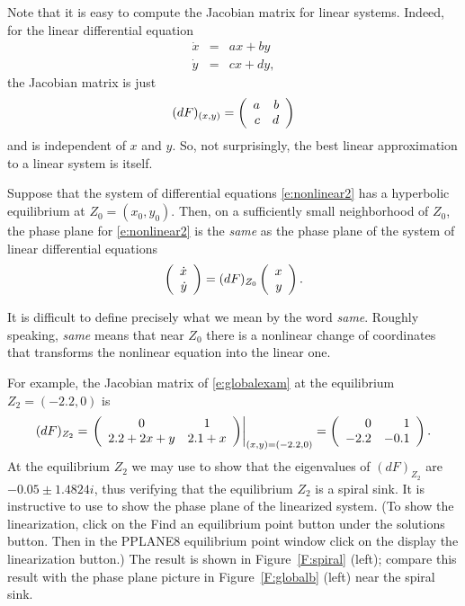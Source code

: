 \documentclass{ximera}
\begin{document}
Note that it is easy to compute the Jacobian matrix for linear 
systems.  Indeed, for the linear differential equation
\begin{eqnarray*}
\dot{x} & = & ax+by \\ \dot{y} & = & cx+dy,
\end{eqnarray*}
the Jacobian matrix is just 
\[
(dF)_{(x,y)} = \left(\begin{array}{rr} a & b\\ c &d\end{array}\right)
\]
and is independent of $x$ and $y$.  So, not surprisingly, the 
best linear approximation to a linear system is itself.

\begin{theorem} \label{T:linearization} 
Suppose that the system of differential equations
\eqref{e:nonlinear2} has a hyperbolic equilibrium at
$Z_0=(x_0,y_0)$.  Then, on a sufficiently small neighborhood of
$Z_0$, the phase plane for \eqref{e:nonlinear2} is the {\em
same\/} as the phase plane of the system of 
linear differential equations
\begin{equation}  \label{e:linearizedeqn}
\left(\begin{array}{r} \dot{x} \\ \dot{y}\end{array}\right) = (dF)_{Z_0} \left(\begin{array}{r} x \\ y\end{array}\right).
\end{equation}
\end{theorem}  
It is difficult to define precisely what we mean by the word
{\em same\/}. Roughly speaking, {\em same\/} means that near 
$Z_0$ there is a nonlinear change of coordinates that 
transforms the nonlinear equation into the linear one.

For example, the Jacobian matrix of \eqref{e:globalexam} at the
equilibrium $Z_2=(-2.2,0)$ is 
\[
(dF)_{Z_2} = \left.\left(\begin{array}{cc} 0 & 1\\ 2.2+2x+y &2.1+x\end{array}\right)\right|_{(x,y)=(-2.2,0)} 
= \left(\begin{array}{rr} 0 & 1\\ -2.2 &-0.1\end{array}\right).
\]
At the equilibrium $Z_2$ we may use \Matlab to show that the 
eigenvalues of $(dF)_{Z_2}$ are $-0.05\pm 1.4824i$, thus verifying 
that the equilibrium $Z_2$ is a spiral sink.  
It is instructive to use {\pplane} to 
show the phase plane of 
the linearized system.  
(To show the linearization, click on the 
{\sf Find an equilibrium point} button under the {\sf solutions} 
button.  Then in the {\sf PPLANE8 equilibrium point} window click 
on the {\sf display the linearization} button.)  The result is
shown in Figure~\ref{F:spiral} (left); compare this result 
with the phase plane picture in Figure~\ref{F:globalb} (left) 
near the spiral sink.

\begin{figure*}[htb]
           \centerline{%
           }
           \caption{(Left) Trajectory of \protect\eqref{e:linearizedeqn} 
	     near the spiral sink $Z_2$. (Right) The time series $x$ 
		versus $t$ for this solution.}
           \label{F:spiral}
\end{figure*}
\end{document}
